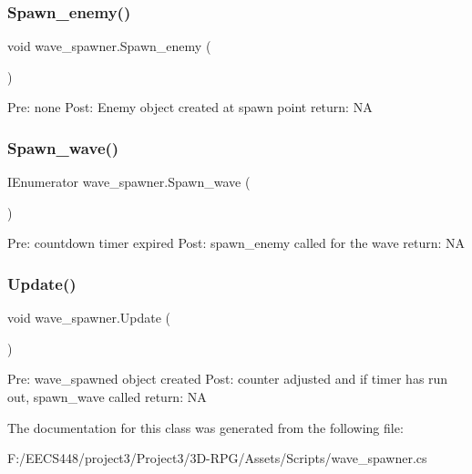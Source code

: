 \subsubsection{\texorpdfstring{Spawn\+\_\+enemy()}{Spawn\_enemy()}}
{\footnotesize\ttfamily void wave\+\_\+spawner.\+Spawn\+\_\+enemy (\begin{DoxyParamCaption}{ }\end{DoxyParamCaption})\hspace{0.3cm}{\ttfamily [private]}}

Pre\+: none Post\+: Enemy object created at spawn point return\+: NA \mbox{\label{classwave__spawner_ad77dc8cd1dbf901d7be2336b5768829e}} 
\subsubsection{\texorpdfstring{Spawn\+\_\+wave()}{Spawn\_wave()}}
{\footnotesize\ttfamily I\+Enumerator wave\+\_\+spawner.\+Spawn\+\_\+wave (\begin{DoxyParamCaption}{ }\end{DoxyParamCaption})\hspace{0.3cm}{\ttfamily [private]}}

Pre\+: countdown timer expired Post\+: spawn\+\_\+enemy called for the wave return\+: NA \mbox{\label{classwave__spawner_ae049116b14cb20519c1c5a2dc2b824d8}} 
\subsubsection{\texorpdfstring{Update()}{Update()}}
{\footnotesize\ttfamily void wave\+\_\+spawner.\+Update (\begin{DoxyParamCaption}{ }\end{DoxyParamCaption})\hspace{0.3cm}{\ttfamily [private]}}

Pre\+: wave\+\_\+spawned object created Post\+: counter adjusted and if timer has run out, spawn\+\_\+wave called return\+: NA 

The documentation for this class was generated from the following file\+:\begin{DoxyCompactItemize}
\item 
F\+:/\+E\+E\+C\+S448/project3/\+Project3/3\+D-\/\+R\+P\+G/\+Assets/\+Scripts/wave\+\_\+spawner.\+cs\end{DoxyCompactItemize}
